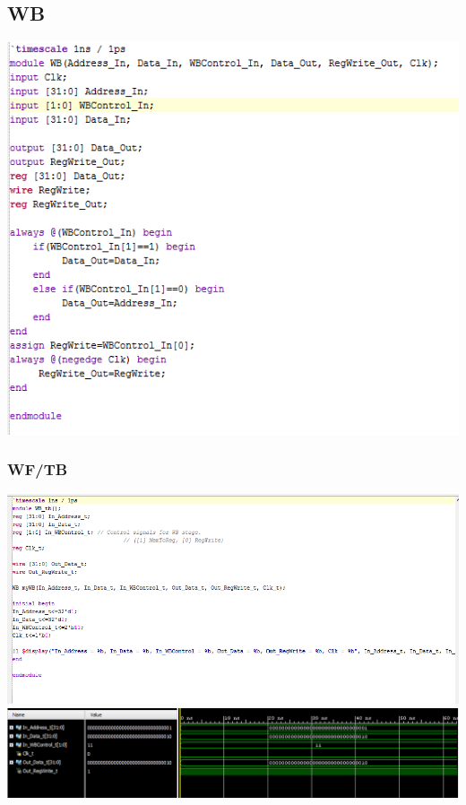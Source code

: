 \documentclass{llncs}
\begin{document}
\begin{addmargin}[-5em]{-2em}
\subsection{WB}
\label{wb:1}
\begin{flushleft}
  \includegraphics[scale=.6]{../Screenshots/WB.PNG}
  \end{flushleft}
\subsubsection{WF/TB}
\begin{flushleft}
\includegraphics[scale=.6]{../Screenshots/WB_tb.PNG}
\includegraphics[scale=.6]{../Screenshots/WB_Waveform.PNG}
\end{flushleft}


\end{addmargin}
\end{document}

